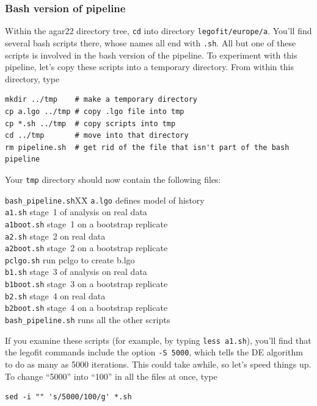 \documentclass[11pt]{article}
\newenvironment{leftindent}%
{\begin{list}{}%
         {\setlength{\leftmargin}{2em}}%
         \item[]%
}{\end{list}}
\begin{document}
\subsubsection{Bash version of pipeline}
\label{sec.bashpipe}
Within the agar22 directory tree, \texttt{cd} into directory
\texttt{legofit/europe/a}. You'll find several bash scripts there,
whose names all end with \texttt{.sh}. All but one of these scripts is
involved in the bash version of the pipeline. To experiment with this
pipeline, let's copy these scripts into a temporary directory. From
within this directory, type
\begin{verbatim}
mkdir ../tmp    # make a temporary directory
cp a.lgo ../tmp # copy .lgo file into tmp
cp *.sh ../tmp  # copy scripts into tmp
cd ../tmp       # move into that directory
rm pipeline.sh  # get rid of the file that isn't part of the bash pipeline
\end{verbatim}
Your \texttt{tmp} directory should now contain the following files:
\begin{leftindent}
\begin{tabbing}
\verb|bash_pipeline.sh|XX\=\kill
\texttt{a.lgo} \> defines model of history\\    
\texttt{a1.sh} \> stage~1 of analysis on real data\\
\texttt{a1boot.sh} \> stage~1 on a bootstrap replicate\\
\texttt{a2.sh} \> stage~2 on real data\\
\texttt{a2boot.sh} \> stage~2 on a bootstrap replicate\\
\texttt{pclgo.sh} \> run pclgo to create b.lgo  \\
\texttt{b1.sh} \> stage~3 of analysis on real data\\
\texttt{b1boot.sh} \> stage~3 on a bootstrap replicate\\
\texttt{b2.sh} \> stage~4 on real data\\
\texttt{b2boot.sh} \> stage~4 on a bootstrap replicate\\
\verb|bash_pipeline.sh| \> runs all the other scripts
\end{tabbing}
\end{leftindent}
If you examine these scripts (for example, by typing
\texttt{less a1.sh}), you'll find that the legofit commands include
the option \texttt{-S 5000}, which tells the DE algorithm to do as
many as 5000 iterations. This could take awhile, so let's speed things
up. To change ``5000'' into ``100'' in all the files at once, type
\begin{verbatim}
sed -i "" 's/5000/100/g' *.sh 
\end{verbatim}
\end{document}
